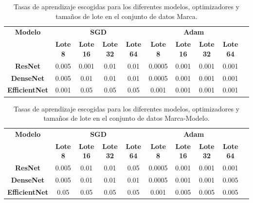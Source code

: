 \begin{table}[H]
	\centering
	\begin{adjustbox}{max width=\textwidth}
		\begin{tabular}{|c|c|c|c|c|c|c|c|c|c|}
			\hline
			\textbf{Modelo} & \multicolumn{4}{c|}{\textbf{SGD}} & \multicolumn{4}{c|}{\textbf{Adam}} \\ \cline{2-9} 
			& \textbf{Lote 8} & \textbf{Lote 16} & \textbf{Lote 32} & \textbf{Lote 64} & \textbf{Lote 8} & \textbf{Lote 16} & \textbf{Lote 32} & \textbf{Lote 64} \\ \hline
			\textbf{ResNet} & 0.005 & 0.001 & 0.01 & 0.01 & 0.0005 & 0.001 & 0.001 & 0.001 \\ \hline
			\textbf{DenseNet} & 0.005 & 0.01 & 0.01 & 0.01 & 0.0005 & 0.001 & 0.001 & 0.001 \\ \hline
			\textbf{EfficientNet} & 0.001 & 0.05 & 0.05 & 0.05 & 0.001 & 0.001 & 0.001 & 0.001 \\ \hline
		\end{tabular}
	\end{adjustbox}
	\caption{Tasas de aprendizaje escogidas para los diferentes modelos, optimizadores y tamaños de lote en el conjunto de datos Marca.}
	\label{tab:bs-optim-marca}
\end{table}

\begin{table}[H]
	\centering
	\begin{adjustbox}{max width=\textwidth}
		\begin{tabular}{|c|c|c|c|c|c|c|c|c|c|}
			\hline
			\textbf{Modelo} & \multicolumn{4}{c|}{\textbf{SGD}} & \multicolumn{4}{c|}{\textbf{Adam}} \\ \cline{2-9} 
			& \textbf{Lote 8} & \textbf{Lote 16} & \textbf{Lote 32} & \textbf{Lote 64} & \textbf{Lote 8} & \textbf{Lote 16} & \textbf{Lote 32} & \textbf{Lote 64} \\ \hline
			\textbf{ResNet} & 0.005 & 0.01 & 0.01 & 0.05 & 0.0005 & 0.001 & 0.001 & 0.001 \\ \hline
			\textbf{DenseNet} & 0.005 & 0.01 & 0.01 & 0.01 & 0.0005 & 0.001 & 0.001 & 0.005 \\ \hline
			\textbf{EfficientNet} & 0.05 & 0.05 & 0.05 & 0.05 & 0.001 & 0.005 & 0.005 & 0.005 \\ \hline
		\end{tabular}
	\end{adjustbox}
	\caption{Tasas de aprendizaje escogidas para los diferentes modelos, optimizadores y tamaños de lote en el conjunto de datos Marca-Modelo.}
	\label{tab:bs-optim-marca-modelo}
\end{table}

